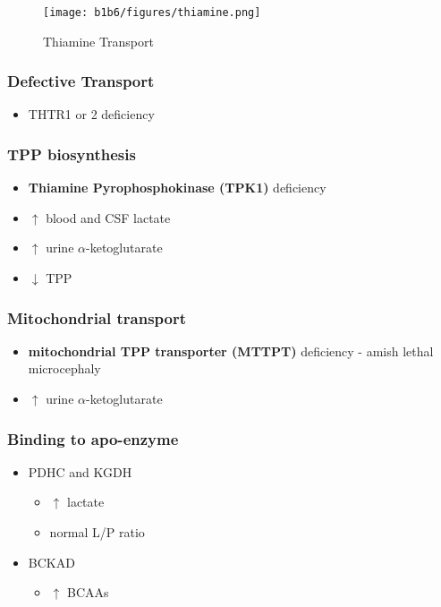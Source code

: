 \documentclass[12pt]{scrartcl}
\begin{document}
\begin{figure}[htbp]
\centering
\texttt{[image: b1b6/figures/thiamine.png]}
\caption{\label{fig:orgb156b14}Thiamine Transport}
\end{figure}

\subsubsection{Defective Transport}
\label{sec:org4bb1bf3}
\begin{itemize}
\item THTR1 or 2 deficiency
\end{itemize}
\subsubsection{TPP biosynthesis}
\label{sec:org1186a62}
\begin{itemize}
\item \textbf{Thiamine Pyrophosphokinase (TPK1)} deficiency
\item \(\uparrow\) blood and CSF lactate
\item \(\uparrow\) urine \(\alpha\)-ketoglutarate
\item \(\downarrow\) TPP
\end{itemize}
\subsubsection{Mitochondrial transport}
\label{sec:org16da5bc}
\begin{itemize}
\item \textbf{mitochondrial TPP transporter (MTTPT)} deficiency - amish lethal
microcephaly
\item \(\uparrow\) urine \(\alpha\)-ketoglutarate
\end{itemize}
\subsubsection{Binding to apo-enzyme}
\label{sec:org2802fa7}
\begin{itemize}
\item PDHC and KGDH
\begin{itemize}
\item \(\uparrow\) lactate
\item normal L/P ratio
\end{itemize}
\item BCKAD
\begin{itemize}
\item \(\uparrow\) BCAAs
\end{itemize}
\end{itemize}
\end{document}
